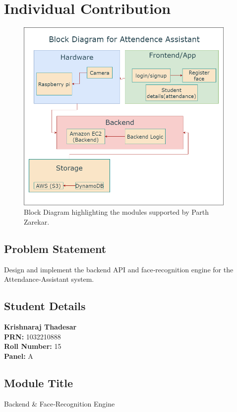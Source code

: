 \documentclass[openany]{report}
\begin{document}
\chapter{Individual Contribution}

\begin{figure}[H]
    \centering
    \includegraphics[width=0.95\textwidth]{../imgs/block diagram.png}
    \caption{Block Diagram highlighting the modules supported by Parth Zarekar.}
    \label{fig:block_diagram_parth}
  \end{figure}
\section{Problem Statement}
Design and implement the backend API and face‐recognition engine for the Attendance‐Assistant system.

\section{Student Details}
\textbf{Krishnaraj Thadesar} \\
\textbf{PRN:} 1032210888 \\
\textbf{Roll Number:} 15 \\
\textbf{Panel:} A \\

\section{Module Title}
Backend \& Face‐Recognition Engine
\end{document}
